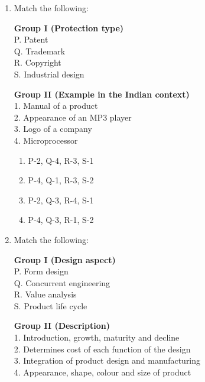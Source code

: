 \documentclass[a4paper,12pt]{article}
\begin{document}
\begin{enumerate}[label=Q.\arabic*, leftmargin=*]
\item{Match the following:}

\vspace{0.5em}

\noindent
\begin{minipage}[t]{0.45\textwidth}
\textbf{Group I (Protection type)}\\[0.5em]
P. Patent \\
Q. Trademark \\
R. Copyright \\
S. Industrial design
\end{minipage}
\hfill
\begin{minipage}[t]{0.8\textwidth}
\textbf{Group II (Example in the Indian context)}\\[0.5em]
1. Manual of a product \\
2. Appearance of an MP3 player \\
3. Logo of a company \\
4. Microprocessor
\end{minipage}

\vspace{1em}

\begin{multicols}{2}
\begin{enumerate}[label=(\Alph*)]
    \item P-2, Q-4, R-3, S-1
    \item P-4, Q-1, R-3, S-2
    \item P-2, Q-3, R-4, S-1
    \item P-4, Q-3, R-1, S-2
\end{enumerate}
\end{multicols}

\item{Match the following:}

\vspace{0.5em}

\noindent
\begin{minipage}[t]{0.5\textwidth}
\textbf{Group I (Design aspect)}\\[0.5em]
P. Form design \\
Q. Concurrent engineering \\
R. Value analysis \\
S. Product life cycle
\end{minipage}
\hfill
\begin{minipage}[t]{0.8\textwidth}
\textbf{Group II (Description)}\\[0.5em]
1. Introduction, growth, maturity and decline \\
2. Determines cost of each function of the design \\
3. Integration of product design and manufacturing \\
4. Appearance, shape, colour and size of product
\end{minipage}


\end{enumerate}
\end{document}
